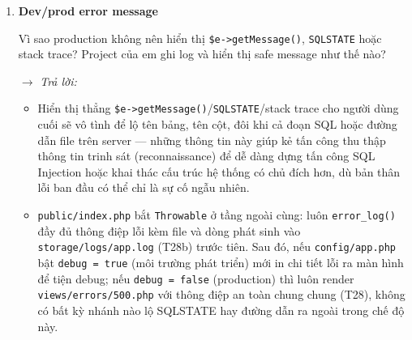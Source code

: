 \begin{enumerate}[label = \textbf{\arabic*.}, leftmargin=*]
    \begin{itemize}[leftmargin = 0.55cm, label = $\bullet$]
        \item \texttt{views/layout.php} chứa navbar, khối flash/toast, nút chuyển dark mode và khung \texttt{<main>} nhúng nội dung qua \texttt{require view\_path(\$view)}; mọi view con (leads, payments, stats, \ldots) chỉ chứa phần nội dung riêng. Nhờ vậy khi cần thêm một mục menu mới hoặc đổi cách hiển thị toast, chỉ cần sửa đúng một file \texttt{layout.php} thay vì rà soát và sửa lặp lại ở hàng chục view — giảm hẳn rủi ro một trang bị quên cập nhật và trở nên không nhất quán với các trang còn lại.
        \item Việc escape được thực hiện ở đúng biên giới cuối cùng trước khi in ra HTML: hàm \texttt{h()}/\texttt{e()} (dùng \texttt{htmlspecialchars()} bên trong) bọc quanh mọi giá trị động ngay tại View — cả dữ liệu đọc từ database (\texttt{h(\$lead['full\_name'])}) lẫn dữ liệu người dùng vừa nhập lại khi form bị lỗi (\texttt{h(\$old['email'] ?? '')}) đều đi qua lớp này trước khi xuất hiện trong HTML, nên một chuỗi kiểu \texttt{<script>alert(1)</script>} được lưu trong tên lead sẽ hiển thị ra màn hình dưới dạng văn bản vô hại thay vì được trình duyệt thực thi.
    \end{itemize}

    \item \textbf{Dev/prod error message}

    Vì sao production không nên hiển thị \texttt{\$e->getMessage()}, \texttt{SQLSTATE} hoặc stack trace? Project của em ghi log và hiển thị safe message như thế nào?

    \hspace*{-0.6cm} $\rightarrow$ \textit{Trả lời:}

    \begin{itemize}[leftmargin = 0.55cm, label = $\bullet$]
        \item Hiển thị thẳng \texttt{\$e->getMessage()}/\texttt{SQLSTATE}/stack trace cho người dùng cuối sẽ vô tình để lộ tên bảng, tên cột, đôi khi cả đoạn SQL hoặc đường dẫn file trên server — những thông tin này giúp kẻ tấn công thu thập thông tin trinh sát (reconnaissance) để dễ dàng dựng tấn công SQL Injection hoặc khai thác cấu trúc hệ thống có chủ đích hơn, dù bản thân lỗi ban đầu có thể chỉ là sự cố ngẫu nhiên.
        \item \texttt{public/index.php} bắt \texttt{Throwable} ở tầng ngoài cùng: luôn \texttt{error\_log()} đầy đủ thông điệp lỗi kèm file và dòng phát sinh vào \texttt{storage/logs/app.log} (T28b) trước tiên. Sau đó, nếu \texttt{config/app.php} bật \texttt{debug = true} (môi trường phát triển) mới in chi tiết lỗi ra màn hình để tiện debug; nếu \texttt{debug = false} (production) thì luôn render \texttt{views/errors/500.php} với thông điệp an toàn chung chung (T28), không có bất kỳ nhánh nào lộ SQLSTATE hay đường dẫn ra ngoài trong chế độ này.
    \end{itemize}


\end{enumerate}
